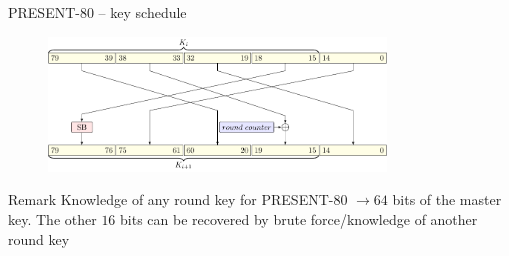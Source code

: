 \begin{frame}{PRESENT-80 -- key schedule}
\begin{figure}
    \centering
    \includegraphics[width=0.8\textwidth]{fig/PRESENT_Key_Schedule.pdf}
\end{figure}
\begin{alertblock}{Remark}
    Knowledge of any round key for PRESENT-80 $\rightarrow64$ bits of the master key.
    The other $16$ bits can be recovered by brute force/knowledge of another round key
\end{alertblock}
\end{frame}